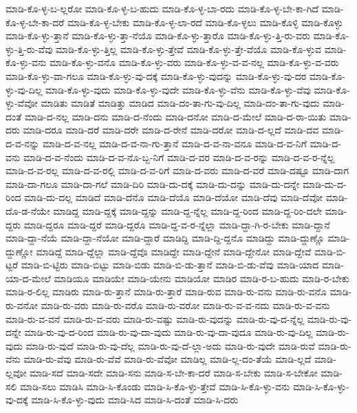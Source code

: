 {ಮಾಡಿ-ಕೊ-ಳ್ಳ-ಬ-ಲ್ಲರೋ
ಮಾಡಿ-ಕೊ-ಳ್ಳ-ಬ-ಹುದು
ಮಾಡಿ-ಕೊ-ಳ್ಳ-ಬಾ-ರದು
ಮಾಡಿ-ಕೊ-ಳ್ಳ-ಬೇ-ಕಾ-ಗಿದೆ
ಮಾಡಿ-ಕೊ-ಳ್ಳ-ಬೇ-ಕಾ-ದರೆ
ಮಾಡಿ-ಕೊ-ಳ್ಳ-ಬೇಕು
ಮಾಡಿ-ಕೊ-ಳ್ಳ-ಲಾ-ರದೆ
ಮಾಡಿ-ಕೊ-ಳ್ಳಲು
ಮಾಡಿ-ಕೊಳ್ಳಿ
ಮಾಡಿ-ಕೊಳ್ಳು
ಮಾಡಿ-ಕೊ-ಳ್ಳು-ತ್ತಾನೆ
ಮಾಡಿ-ಕೊ-ಳ್ಳು-ತ್ತಾ-ನೆಯೊ
ಮಾಡಿ-ಕೊ-ಳ್ಳು-ತ್ತಾರೊ
ಮಾಡಿ-ಕೊ-ಳ್ಳು-ತ್ತಿ-ರು-ವರು
ಮಾಡಿ-ಕೊ-ಳ್ಳು-ತ್ತಿ-ರು-ವೆವು
ಮಾಡಿ-ಕೊ-ಳ್ಳು-ತ್ತಿಲ್ಲ
ಮಾಡಿ-ಕೊ-ಳ್ಳು-ತ್ತೇವೆ
ಮಾಡಿ-ಕೊ-ಳ್ಳು-ತ್ತೇ-ವೆಯೊ
ಮಾಡಿ-ಕೊ-ಳ್ಳುವ
ಮಾಡಿ-ಕೊ-ಳ್ಳು-ವನು
ಮಾಡಿ-ಕೊ-ಳ್ಳು-ವನೊ
ಮಾಡಿ-ಕೊ-ಳ್ಳು-ವರು
ಮಾಡಿ-ಕೊ-ಳ್ಳು-ವ-ವ-ನಲ್ಲ
ಮಾಡಿ-ಕೊ-ಳ್ಳು-ವ-ವರು
ಮಾಡಿ-ಕೊ-ಳ್ಳು-ವಾ-ಗಲೂ
ಮಾಡಿ-ಕೊ-ಳ್ಳು-ವು-ದಕ್ಕೆ
ಮಾಡಿ-ಕೊ-ಳ್ಳು-ವುದನ್ನು
ಮಾಡಿ-ಕೊ-ಳ್ಳು-ವು-ದರ
ಮಾಡಿ-ಕೊ-ಳ್ಳು-ವು-ದಿಲ್ಲ
ಮಾಡಿ-ಕೊ-ಳ್ಳು-ವುದು
ಮಾಡಿ-ಕೊ-ಳ್ಳು-ವುದೇ
ಮಾಡಿ-ಕೊ-ಳ್ಳು-ವೆನು
ಮಾಡಿ-ಕೊ-ಳ್ಳು-ವೆವು
ಮಾಡಿ-ಕೊ-ಳ್ಳು-ವೆವೋ
ಮಾಡಿತು
ಮಾಡಿತೆ
ಮಾಡಿತ್ತು
ಮಾಡಿದ
ಮಾಡಿ-ದಂ-ತಾ-ಗು-ವು-ದಿಲ್ಲ
ಮಾಡಿ-ದಂ-ತಾ-ಗು-ವುದು
ಮಾಡಿ-ದಂತೆ
ಮಾಡಿ-ದ-ನಲ್ಲ
ಮಾಡಿ-ದನು
ಮಾಡಿ-ದ-ನೆಂದು
ಮಾಡಿ-ದನೋ
ಮಾಡಿ-ದ-ಮೇಲೆ
ಮಾಡಿ-ದ-ರಾ-ಯಿತು
ಮಾಡಿ-ದರು
ಮಾಡಿ-ದರೂ
ಮಾಡಿ-ದರೆ
ಮಾಡಿ-ದರೇ
ಮಾಡಿ-ದ-ರೇನೆ
ಮಾಡಿ-ದರೋ
ಮಾಡಿ-ದ-ಲ್ಲದೆ
ಮಾಡಿ-ದವ
ಮಾಡಿ-ದ-ವ-ನನ್ನು
ಮಾಡಿ-ದ-ವ-ನಲ್ಲ
ಮಾಡಿ-ದ-ವ-ನಾ-ಗು-ತ್ತಾನೆ
ಮಾಡಿ-ದ-ವ-ನಾ-ವನೂ
ಮಾಡಿ-ದ-ವ-ನಿಗೆ
ಮಾಡಿ-ದ-ವನು
ಮಾಡಿ-ದ-ವ-ನೆಂದು
ಮಾಡಿ-ದ-ವ-ನೊ-ಬ್ಬ-ನಿಗೆ
ಮಾಡಿ-ದ-ವರ
ಮಾಡಿ-ದ-ವ-ರನ್ನು
ಮಾಡಿ-ದ-ವ-ರ-ನ್ನೆಲ್ಲ
ಮಾಡಿ-ದ-ವ-ರಲ್ಲ
ಮಾಡಿ-ದ-ವ-ರಲ್ಲಿ
ಮಾಡಿ-ದ-ವ-ರಿಗೆ
ಮಾಡಿ-ದ-ವರು
ಮಾಡಿ-ದ-ವರೆ
ಮಾಡಿ-ದಷ್ಟೂ
ಮಾಡಿ-ದಾಗ
ಮಾಡಿ-ದಾ-ಗಲೂ
ಮಾಡಿ-ದಾ-ಗಲೆ
ಮಾಡಿ-ದಿರಿ
ಮಾಡಿ-ದು-ದಕ್ಕೆ
ಮಾಡಿ-ದು-ದನ್ನು
ಮಾಡಿ-ದು-ದನ್ನೇ
ಮಾಡಿ-ದು-ದ-ರಿಂದ
ಮಾಡಿ-ದು-ದಲ್ಲ
ಮಾಡಿದೆ
ಮಾಡಿ-ದೆನೊ
ಮಾಡಿ-ದೆಯೊ
ಮಾಡಿ-ದೆಯೋ
ಮಾಡಿ-ದೆವು
ಮಾಡಿ-ದೆವೋ
ಮಾಡಿ-ದೊ-ಡ-ನೆಯೇ
ಮಾಡಿದ್ದ
ಮಾಡಿ-ದ್ದಕ್ಕೆ
ಮಾಡಿ-ದ್ದನ್ನು
ಮಾಡಿ-ದ್ದ-ನ್ನೆಲ್ಲ
ಮಾಡಿ-ದ್ದ-ರಿಂದ
ಮಾಡಿ-ದ್ದ-ರಿಂ-ದಲೇ
ಮಾಡಿ-ದ್ದರು
ಮಾಡಿ-ದ್ದರೂ
ಮಾಡಿ-ದ್ದರೆ
ಮಾಡಿ-ದ್ದರೊ
ಮಾಡಿ-ದ್ದ-ವ-ರ-ನ್ನೆಲ್ಲಾ
ಮಾಡಿ-ದ್ದಾ-ಗಿ-ರ-ಬೇಕು
ಮಾಡಿ-ದ್ದಾನೆ
ಮಾಡಿ-ದ್ದಾ-ನೆಯೆ
ಮಾಡಿ-ದ್ದಾ-ನೆಯೋ
ಮಾಡಿ-ದ್ದಾರೆ
ಮಾಡಿದ್ದಿ
ಮಾಡಿ-ದ್ದಿ-ದ್ದನೊ
ಮಾಡಿದ್ದು
ಮಾಡಿ-ದ್ದುಣ್ಣೊ
ಮಾಡಿ-ದ್ದುಣ್ಣೋ
ಮಾಡಿದ್ದೆ
ಮಾಡಿ-ದ್ದೆಲ್ಲಾ
ಮಾಡಿ-ದ್ದೆವೊ
ಮಾಡಿದ್ದೇ
ಮಾಡಿ-ದ್ದೇನೆ
ಮಾಡಿ-ದ್ದೇನೋ
ಮಾಡಿ-ದ್ದೇವೆ
ಮಾಡಿ-ಬಿ-ಟ್ಟರೆ
ಮಾಡಿ-ಬಿ-ಟ್ಟಿರು
ಮಾಡಿ-ಬಿಟ್ಟು
ಮಾಡಿ-ಬಿಡು
ಮಾಡಿ-ಬಿ-ಡು-ತ್ತಾನೆ
ಮಾಡಿ-ಬಿ-ಡು-ವೆವು
ಮಾಡಿ-ಯಾದ
ಮಾಡಿ-ಯಾ-ದ-ಮೇಲೆ
ಮಾಡಿಯೂ
ಮಾಡಿಯೇ
ಮಾಡಿ-ಯೇನು
ಮಾಡಿಯೋ
ಮಾಡಿರ
ಮಾಡಿ-ರ-ಬ-ಹುದು
ಮಾಡಿ-ರ-ಬೇಕು
ಮಾಡಿ-ರ-ಲಿಲ್ಲ
ಮಾಡಿರು
ಮಾಡಿ-ರು-ತ್ತಾನೆ
ಮಾಡಿ-ರು-ತ್ತಾರೆ
ಮಾಡಿ-ರುವ
ಮಾಡಿ-ರು-ವನು
ಮಾಡಿ-ರು-ವನೊ
ಮಾಡಿ-ರು-ವನೋ
ಮಾಡಿ-ರು-ವರು
ಮಾಡಿ-ರು-ವರೊ
ಮಾಡಿ-ರು-ವರೋ
ಮಾಡಿ-ರು-ವ-ವ-ನದು
ಮಾಡಿ-ರು-ವ-ವನು
ಮಾಡಿ-ರು-ವ-ವನೆ
ಮಾಡಿ-ರು-ವ-ವರು
ಮಾಡಿ-ರು-ವಷ್ಟು
ಮಾಡಿ-ರು-ವುದನ್ನು
ಮಾಡಿ-ರು-ವು-ದ-ನ್ನೆಲ್ಲ
ಮಾಡಿ-ರು-ವು-ದನ್ನೇ
ಮಾಡಿ-ರು-ವು-ದ-ರಿಂದ
ಮಾಡಿ-ರು-ವು-ದಾ-ವುದು
ಮಾಡಿ-ರು-ವು-ದಾ-ವುದೂ
ಮಾಡಿ-ರು-ವು-ದಿಲ್ಲ
ಮಾಡಿ-ರು-ವುದು
ಮಾಡಿ-ರು-ವುದೆ
ಮಾಡಿ-ರು-ವು-ದೆಲ್ಲ
ಮಾಡಿ-ರು-ವು-ದೆ-ಲ್ಲಾ-ಅದು
ಮಾಡಿ-ರು-ವುದೇ
ಮಾಡಿ-ರುವೆ
ಮಾಡಿ-ರು-ವೆನು
ಮಾಡಿ-ರು-ವೆವು
ಮಾಡಿ-ರು-ವೆವೆ
ಮಾಡಿ-ರು-ವೆವೋ
ಮಾಡಿಲ್ಲ
ಮಾಡಿ-ಲ್ಲ-ದಂ-ತೆಯೆ
ಮಾಡಿ-ಲ್ಲದೆ
ಮಾಡಿ-ಲ್ಲವೋ
ಮಾಡಿ-ಸದೆ
ಮಾಡಿ-ಸದೇ
ಮಾಡಿ-ಸನು
ಮಾಡಿ-ಸ-ಬೇ-ಕಾ-ದರೆ
ಮಾಡಿ-ಸ-ಬೇಕು
ಮಾಡಿ-ಸ-ಬೇಕೋ
ಮಾಡಿ-ಸಲಿ
ಮಾಡಿ-ಸಲು
ಮಾಡಿಸಿ
ಮಾಡಿ-ಸಿ-ಕೊಂಡು
ಮಾಡಿ-ಸಿ-ಕೊ-ಳ್ಳು-ತ್ತೇವೆ
ಮಾಡಿ-ಸಿ-ಕೊ-ಳ್ಳು-ವನು
ಮಾಡಿ-ಸಿ-ಕೊ-ಳ್ಳು-ವು-ದಕ್ಕೆ
ಮಾಡಿ-ಸಿ-ಕೊ-ಳ್ಳು-ವುದು
ಮಾಡಿ-ಸಿದ
ಮಾಡಿ-ಸಿ-ದಂತೆ
ಮಾಡಿ-ಸಿ-ದರು
}
